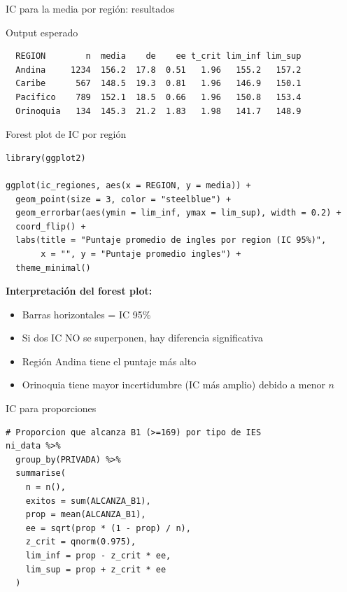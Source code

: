 \documentclass[aspectratio=169, 11pt]{beamer}
\begin{document}
\begin{frame}[fragile]{IC para la media por región: resultados}
\begin{exampleblock}{Output esperado}
\small
\begin{verbatim}
  REGION        n  media    de    ee t_crit lim_inf lim_sup
  Andina     1234  156.2  17.8  0.51   1.96   155.2   157.2
  Caribe      567  148.5  19.3  0.81   1.96   146.9   150.1
  Pacifico    789  152.1  18.5  0.66   1.96   150.8   153.4
  Orinoquia   134  145.3  21.2  1.83   1.98   141.7   148.9
\end{verbatim}
\end{exampleblock}
\end{frame}

\begin{frame}[fragile]{Forest plot de IC por región}
\begin{lstlisting}
library(ggplot2)

ggplot(ic_regiones, aes(x = REGION, y = media)) +
  geom_point(size = 3, color = "steelblue") +
  geom_errorbar(aes(ymin = lim_inf, ymax = lim_sup), width = 0.2) +
  coord_flip() +
  labs(title = "Puntaje promedio de ingles por region (IC 95%)",
       x = "", y = "Puntaje promedio ingles") +
  theme_minimal()
\end{lstlisting}

\vspace{0.3cm}
\textbf{Interpretación del forest plot:}
\begin{itemize}
\item Barras horizontales = IC 95\%
\item Si dos IC NO se superponen, hay diferencia significativa
\item Región Andina tiene el puntaje más alto
\item Orinoquia tiene mayor incertidumbre (IC más amplio) debido a menor $n$
\end{itemize}
\end{frame}

\begin{frame}[fragile]{IC para proporciones}
\begin{lstlisting}
# Proporcion que alcanza B1 (>=169) por tipo de IES
ni_data %>%
  group_by(PRIVADA) %>%
  summarise(
    n = n(),
    exitos = sum(ALCANZA_B1),
    prop = mean(ALCANZA_B1),
    ee = sqrt(prop * (1 - prop) / n),
    z_crit = qnorm(0.975),
    lim_inf = prop - z_crit * ee,
    lim_sup = prop + z_crit * ee
  )
\end{lstlisting}
\end{frame}
\end{document}
